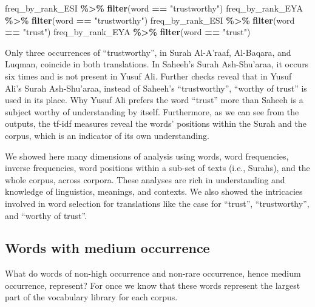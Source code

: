 \documentclass[
]{article}
\newenvironment{Shaded}{\begin{snugshade}}{\end{snugshade}}
\newcommand{\FunctionTok}[1]{\textcolor[rgb]{0.13,0.29,0.53}{\textbf{#1}}}
\newcommand{\NormalTok}[1]{#1}
\newcommand{\SpecialCharTok}[1]{\textcolor[rgb]{0.81,0.36,0.00}{\textbf{#1}}}
\newcommand{\StringTok}[1]{\textcolor[rgb]{0.31,0.60,0.02}{#1}}
\begin{document}
\footnotesize

\begin{Shaded}
\begin{Highlighting}[]
\NormalTok{freq\_by\_rank\_ESI }\SpecialCharTok{\%\textgreater{}\%} \FunctionTok{filter}\NormalTok{(word }\SpecialCharTok{==} \StringTok{"trustworthy"}\NormalTok{)}
\NormalTok{freq\_by\_rank\_EYA }\SpecialCharTok{\%\textgreater{}\%} \FunctionTok{filter}\NormalTok{(word }\SpecialCharTok{==} \StringTok{"trustworthy"}\NormalTok{)}
\NormalTok{freq\_by\_rank\_ESI }\SpecialCharTok{\%\textgreater{}\%} \FunctionTok{filter}\NormalTok{(word }\SpecialCharTok{==} \StringTok{"trust"}\NormalTok{)}
\NormalTok{freq\_by\_rank\_EYA }\SpecialCharTok{\%\textgreater{}\%} \FunctionTok{filter}\NormalTok{(word }\SpecialCharTok{==} \StringTok{"trust"}\NormalTok{)}
\end{Highlighting}
\end{Shaded}

\normalsize

Only three occurrences of ``trustworthy'', in Surah Al-A'raaf, Al-Baqara, and Luqman, coincide in both translations. In Saheeh's Surah Ash-Shu'araa, it occurs six times and is not present in Yusuf Ali. Further checks reveal that in Yusuf Ali's Surah Ash-Shu'araa, instead of Saheeh's ``trustworthy'', ``worthy of trust'' is used in its place. Why Yusuf Ali prefers the word ``trust'' more than Saheeh is a subject worthy of understanding by itself. Furthermore, as we can see from the outputs, the tf-idf measures reveal the words' positions within the Surah and the corpus, which is an indicator of its own understanding.

We showed here many dimensions of analysis using words, word frequencies, inverse frequencies, word positions within a sub-set of texts (i.e., Surahs), and the whole corpus, across corpora. These analyses are rich in understanding and knowledge of linguistics, meanings, and contexts. We also showed the intricacies involved in word selection for translations like the case for ``trust'', ``trustworthy'', and ``worthy of trust''.

\hypertarget{words-with-medium-occurrence}{%
\subsection{Words with medium occurrence}\label{words-with-medium-occurrence}}

What do words of non-high occurrence and non-rare occurrence, hence medium occurrence, represent? For once we know that these words represent the largest part of the vocabulary library for each corpus.
\end{document}
